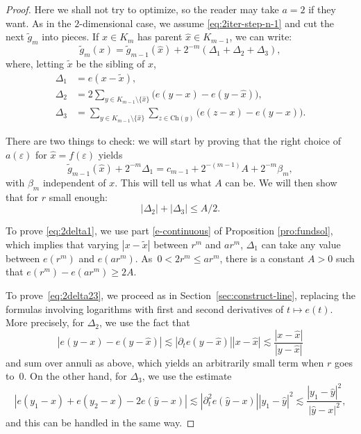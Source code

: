 \documentclass[JEP,XML,SOM,Unicode,published]{cedram}
\let\backslash\setminus
\let\wt\widetilde
\let\wh\widehat
\numberwithin{equation}{section}
\theoremstyle{plain}
\theoremstyle{definition}
\begin{document}
\begin{proof}
Here we shall not try to optimize, so the reader may take $a = 2$ if they want.
As in the $2$-dimensional case, we assume \eqref{eq:2iter-step-n-1} and
cut the next $\wt g_m$ into pieces.
If $x\in K_m$ has parent $\wh x\in K_{m-1}$, we can write:
\begin{equation*}
\wt g_{m}(x) =\wt g_{m-1}(\wh x) + 2^{-m} (\Delta_1+ \Delta_2+\Delta_3),
\end{equation*}
where, letting $\wt x$ be the sibling of $x$,
\begin{align*}
\Delta_1 &= e(x- \wt x),\\
\Delta_2 &= 2 \sum_{y\in K_{m-1}\backslash \{\wh x\}} \big ( e(y-x)-e(y-\wh x)\big),\\
\tag*{and}
\Delta_3 &= \sum_{y\in K_{m-1}\backslash \{\wh x\}}\sum_{z\in \mathrm{Ch}(y)} \big ( e(z-x)-e(y-x)\big).
\end{align*}

There are two things to check: we will start by proving
that the right choice of $a(\varepsilon)$ for $\wh x=f(\varepsilon)$ yields
\begin{equation}\label{eq:2delta1}
\wt g_{m-1}(\wh x) + 2^{-m} \Delta_1 = c_{m-1} + 2^{-(m-1)}A + 2^{-m}\beta_m ,
\end{equation}
with $\beta_m$ independent of $x$. This will tell us what $A$ can be. We will then show that for $r$ small enough:
\begin{equation}\label{eq:2delta23}
|\Delta_2|+|\Delta_3|\leq A/2.
\end{equation}

To prove \eqref{eq:2delta1}, we use part \eqref{e-continuous} of Proposition \ref{pro:fundsol}, which implies that varying \hbox{$|x-\wt x|$} between $r^m$ and $a r^m$, $\Delta_1$ can take any value between $e(r^m)$ and $e(a r^m)$.
As~\hbox{$0 < 2 r^m \leq a r^m$},
there is a constant $A>0$ such that $e(r^m)-e(ar^m)\ge 2A$.

To prove~\eqref{eq:2delta23}, we proceed as in Section~\ref{sec:construct-line},
replacing the formulas involving logarithms with first and second derivatives of $t\mapsto e(t)$. More precisely, for $\Delta_2$, we use the fact that
\begin{equation*}
|e(y-x) - e(y-\wh x)| \lesssim |\partial_t e(y-\wh x)| |x-\wh x| \lesssim \dfrac{ |x-\wh x|}{|y-\wh x|}
\end{equation*}
and sum over annuli as above, which yields an arbitrarily small term when $r$ goes to~$0$. On the other hand, for $\Delta_3$, we use the estimate
\begin{equation*}
|e(y_1-x) + e(y_2 - x) -2 e(\wh y-x)| \lesssim |\partial_t^2e(\wh y-x)| |y_1-\wh y|^2 \lesssim \dfrac{ |y_1-\wh y|^2}{|\wh y-x|^2},
\end{equation*}
and this can be handled in the same way.


\end{proof}
\end{document}
